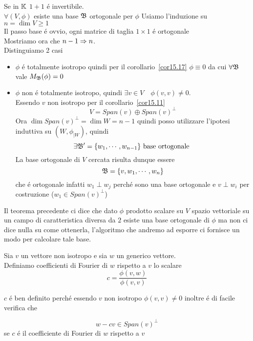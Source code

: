 \begin{thm}\bianco
Se in $\mathbb{K}$ $1+1 $ \'e invertibile.\\
$\forall (V, \phi) $ esiste una base $\mathfrak{B} $ ortogonale per $\phi$
\proof Usiamo l'induzione su $n = \dim V \geq 1$ \\
Il passo  base \'e ovvio, ogni matrice di taglia $1 \times 1 $  \'e ortogonale \\
Mostriamo ora che $n-1 \Rightarrow n $.\\
Distinguiamo 2 casi 
\begin{itemize}
\item $\phi$ \'e totalmente isotropo quindi per il corollario~\ref{cor15.17} $\phi \equiv 0 $ da cui  $\forall \mathfrak{B}$ vale $M_{\mathfrak{B}} (\phi)=0$
\item $\phi$ non \'e totalmente isotropo, quindi $\exists v \in V \quad \phi(v,v) \neq 0 $.\\
Essendo $v$ non isotropo per il  corollario~\ref{cor15.11}
$$ V  = Span (v) \oplus Span(v) ^ \perp $$
Ora $\dim Span(v) ^ \perp =\dim W = n-1$ quindi posso utilizzare l'ipotesi  induttiva su $(W, \phi_{\vert W})$, quindi
$$ \exists \mathfrak{B}'=\{ w_1, \cdots , w_{n-1} \} \text{ base ortogonale } $$ 
La base ortogonale di $V$ cercata risulta dunque essere
$$ \mathfrak{B}=\{v , w_1, \cdots , w_n \} $$
che \'e ortogonale infatti $ w_1 \perp w_j $ perch\'e sono una base ortogonale e $v \perp w_i $ per costruzione ($w_1 \in Span(v)^\perp $) 
\endproof
\end{itemize}
\end{thm}
\spazio
Il teorema precedente ci dice che dato $\phi$ prodotto scalare su $V$ spazio vettoriale su un campo di caratteristica diversa da $2$ esiste una base ortogonale di $\phi$ ma non ci dice nulla su come ottenerla, l'algoritmo che andremo ad esporre ci fornisce un modo per calcolare tale base.
\spazio 
\begin{defn}\bianco
Sia $v$ un vettore non isotropo e sia $w$ un generico vettore.\\
Definiamo coefficienti di Fourier di $w$ rispetto a $v$ lo scalare
$$ c= \frac{\phi(v,w)}{\phi(v,v)}$$
\begin{oss}$c$ \'e ben definito perch\'e essendo $v$ non isotropo $\phi(v,v) \neq 0$ inoltre \'e di facile verifica che

$$w-cv \in Span(v)^\perp $$ se $c$ \'e il coefficiente di Fourier di $w$ rispetto a $v$ 
\end{oss}
\end{defn}
\spazio 
